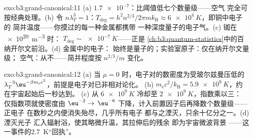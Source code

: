 \begin{solution}{exo:b3:grand-canonical:11}
(a) $\num{1.7e-7}$：比阈值低七个数量级——空气
完全可按经典处理。(b) 令 $n\lambda_T^3 = 1$：$T_{\text{deg}} =
h^2n^{2/3}/2\pi mk_{\text{B}} \approx \qty{6e4}{K}$，即铜中电子的
简并温度——你摸过的每一种金属都携带
一种深度量子的电子气。(c) 铷在 \qty{e20}{m^{-3}} 时：
$T_{\text{deg}} \sim \qty{e-7}{K}$——正是
\cref{ch:b3:quantum-statistics}中的百纳开尔文前沿。(d) 金属中的电子：
始终是量子的；实验室原子：仅在纳开尔文量级；
空气：从不——简并程度按 $n^{2/3}/m$ 变化。
\end{solution}

\begin{solution}{exo:b3:grand-canonical:12}
(a) 当 $\mu = 0$ 时，电子对的数密度为受玻尔兹曼压低的
$\lambda_T^{-3}\eu^{-\beta m_{\text{e}}c^2}$，前提是电子对已非相对论化。
(b) $m_{\text{e}}c^2/k_{\text{B}} =
\qty{5.9e9}{K}$，约在宇宙起始后一秒达到。
(c) 从 $\qty{6e9}{K}$ 冷却至 $\qty{2e9}{K}$，指数乘以三：
仅指数项就使密度由 $\eu^{-2} \to$
$\eu^{-6}$ 下降，计入前置因子后再降数个数量级——正电子
在数秒之内便消失殆尽，几乎所有电子
都与之湮灭，只余十亿分之一。(d) 湮灭光子
汇入辐射浴，使其略微升温，其拉伸后的残余
即为宇宙微波背景
——这一事件的\qty{2.7}{K}“回执”。
\end{solution}

